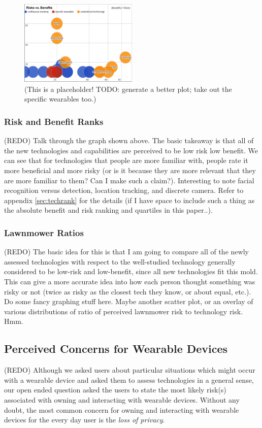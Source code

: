 \documentclass{acm_proc_article-sp}
\begin{document}
\begin{figure}
	\centering
	\includegraphics[width=0.5\textwidth]{techplot.png}
	\caption{(This is a placeholder! TODO: generate a better plot; take out the specific wearables too.)}
\end{figure}

\subsubsection{Risk and Benefit Ranks} 
(REDO) Talk through the graph shown above. The basic takeaway is that all of the new technologies and capabilities are perceived to be low risk low benefit. We can see that for technologies that people are more familiar with, people rate it more beneficial and more risky (or is it because they are more relevant that they are more familiar to them? Can I make such a claim?). Interesting to note facial recognition versus detection, location tracking, and discrete camera. Refer to appendix \ref{sec:techrank} for the details (if I have space to include such a thing as the absolute benefit and risk ranking and quartiles in this paper..). 

\subsubsection{Lawnmower Ratios} 
(REDO) The basic idea for this is that I am going to compare all of the newly assessed technologies with respect to the well-studied technology generally considered to be low-risk and low-benefit, since all new technologies fit this mold. This can give a more accurate idea into how each person thought something was risky or not (twice as risky as the closest tech they know, or about equal, etc.). Do some fancy graphing stuff here. Maybe another scatter plot, or an overlay of various distributions of ratio of perceived lawnmower risk to technology risk. Hmm. 

\subsection{Perceived Concerns for Wearable Devices}
(REDO) Although we asked users about particular situations which might occur with a wearable device and asked them to assess technologies in a general sense, our open ended question asked the users to state the most likely risk(s) associated with owning and interacting with wearable devices. Without any doubt, the most common concern for owning and interacting with wearable devices for the every day user is the \textit{loss of privacy}. 
\end{document}
